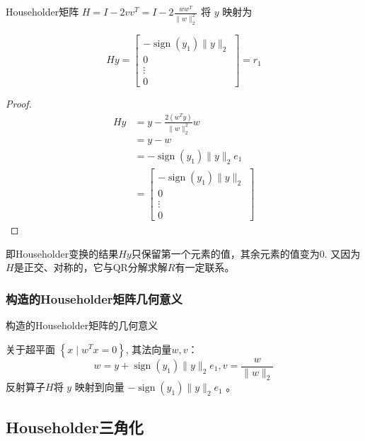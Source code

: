 \begin{theorem}
    Householder矩阵 $ H=I-2 v v^{T}=I-2 \frac{w w^{T}}{\|w\|_{2}^{2}} $ 将 $ y $ 映射为

   $$ H y = \left[\begin{array}{c}-\operatorname{sign}\left(y_{1}\right)\|y\|_{2} \\ 0 \\ \vdots \\ 0\end{array}\right] = r_1 $$
\end{theorem}


\begin{proof}
    $$ 
\begin{aligned}
    H y&=y-\frac{2\left(w^{T} y\right)}{\|w\|_{2}^{2}} w\\
    &=y-w\\
    &=-\operatorname{sign}\left(y_{1}\right)\|y\|_{2} e_{1}\\
    &=\left[\begin{array}{c}-\operatorname{sign}\left(y_{1}\right)\|y\|_{2} \\ 0 \\ \vdots \\ 0\end{array}\right]
\end{aligned}
 $$
\end{proof}

即Householder变换的结果$Hy$只保留第一个元素的值，其余元素的值变为0. 又因为$H$是正交、对称的，它与QR分解求解$R$有一定联系。

\subsubsection{构造的Householder矩阵几何意义}


\begin{FigureCenter}{构造的Householder矩阵的几何意义}
   
\end{FigureCenter}


关于超平面 $ \left\{x \mid w^{T} x=0\right\} $, 其法向量$w,v$：
$$
w=y+\operatorname{sign}\left(y_{1}\right)\|y\|_{2} e_{1},v=\frac{w}{\|w\|_{2}}
$$
反射算子$H$将 $ y $ 映射到向量 $ -\operatorname{sign}\left(y_{1}\right)\|y\|_{2} e_{1} $ 。

\subsection{Householder三角化}

